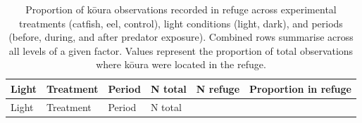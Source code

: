 \documentclass[
  12pt,
  a4paper,
]{scrbook}
\begin{document}
\begin{longtable}[]{@{}
  >{\raggedright\arraybackslash}p{}
  >{\raggedright\arraybackslash}p{}
  >{\raggedright\arraybackslash}p{}
  >{\raggedleft\arraybackslash}p{}
  >{\raggedleft\arraybackslash}p{}
  >{\raggedleft\arraybackslash}p{}@{}}
\caption{Proportion of kōura observations recorded in refuge across
experimental treatments (catfish, eel, control), light conditions
(light, dark), and periods (before, during, and after predator
exposure). Combined rows summarise across all levels of a given factor.
Values represent the proportion of total observations where kōura were
located in the refuge.}\tabularnewline
\toprule\noalign{}
\begin{minipage}[b]{\linewidth}\raggedright
Light
\end{minipage} & \begin{minipage}[b]{\linewidth}\raggedright
Treatment
\end{minipage} & \begin{minipage}[b]{\linewidth}\raggedright
Period
\end{minipage} & \begin{minipage}[b]{\linewidth}\raggedleft
N total
\end{minipage} & \begin{minipage}[b]{\linewidth}\raggedleft
N refuge
\end{minipage} & \begin{minipage}[b]{\linewidth}\raggedleft
Proportion in refuge
\end{minipage} \\
\midrule\noalign{}
\endfirsthead
\toprule\noalign{}
\begin{minipage}[b]{\linewidth}\raggedright
Light
\end{minipage} & \begin{minipage}[b]{\linewidth}\raggedright
Treatment
\end{minipage} & \begin{minipage}[b]{\linewidth}\raggedright
Period
\end{minipage} & \begin{minipage}[b]{\linewidth}\raggedleft
N total
\end{minipage} & \begin{minipage}[b]{\linewidth}\raggedleft

\end{minipage}
\end{longtable}
\end{document}

